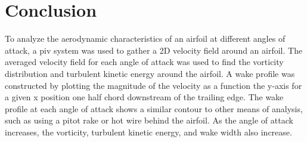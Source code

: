 \chapter{Conclusion}
\label{cp:conclusion}
To analyze the aerodynamic characteristics of an airfoil at different angles of attack, a \acrfull{piv} system was used to gather a 2D velocity field around an airfoil. The averaged velocity field for each angle of attack was used to find the vorticity distribution and turbulent kinetic energy around the airfoil. A wake profile was constructed by plotting the magnitude of the velocity as a function the \gls{y}-axis for a given \gls{x} position one half chord downstream of the trailing edge. The wake profile at each angle of attack shows a similar contour to other means of analysis, such as using a pitot rake or hot wire behind the airfoil. As the angle of attack increases, the vorticity, turbulent kinetic energy, and wake width also increase.